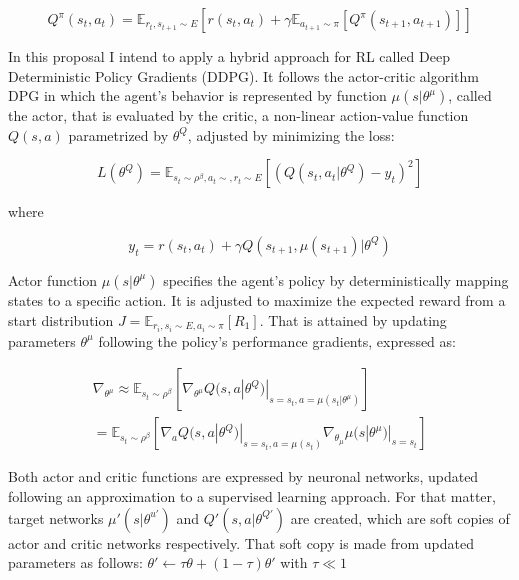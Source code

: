 \documentclass[peerreview]{IEEEtran}
\begin{document}
 \begin{equation}
 	Q^\pi(s_t, a_t) = \mathbb{E}_{r_t, s_{t+1} \sim E} [r(s_t, a_t) + \gamma\mathbb{E}_{a_{t+1} \sim \pi} [Q^\pi(s_{t+1}, a_{t+1})]]
 \end{equation}
 
 In this proposal I intend to apply a hybrid approach for RL called Deep Deterministic Policy Gradients (DDPG). It follows the actor-critic algorithm DPG in which the agent's behavior is represented by function $\mu(s|\theta^\mu)$, called the actor, that is evaluated by the critic, a non-linear action-value function $Q(s,a)$ parametrized by $\theta^Q$, adjusted by minimizing the loss:
 
 \begin{equation}
   L(\theta^Q) = \mathbb{E}_{s_t \sim \rho^\beta, a_t \sim, r_t \sim E}[(Q(s_t,a_t|\theta^Q)- y_t)^2]
 \end{equation}
 
 where
 
 \begin{equation}
 	y_t = r(s_t, a_t) + \gamma Q(s_{t+1}, \mu(s_{t+1})|\theta^Q)
 \end{equation}
 
Actor function $\mu(s|\theta^\mu)$ specifies the agent's policy by deterministically mapping states to a specific action. It is adjusted to maximize the expected reward from a start distribution $J=\mathbb{E}_{r_i, s_i \sim E, a_i \sim \pi}[R_1]$. That is attained by updating parameters $\theta^\mu$ following the policy's performance gradients, expressed as:

\begin{equation}
\begin{split}
	\nabla_{\theta^\mu} \approx \mathbb{E}_{s_t \sim \rho^\beta}[\nabla_{\theta^\mu}Q(s,a|\theta^Q)|_{s=s_t, a=\mu(s_t|\theta^\mu)}] \\	
	= \mathbb{E}_{s_t \sim \rho ^ \beta}[\nabla_a Q(s,a|\theta^Q)|_{s=s_t, a=\mu(s_t)} \nabla_{\theta_\mu} \mu(s|\theta^\mu)|_{s=s_t}]
	\end{split}
\end{equation}

 Both actor and critic functions are expressed by neuronal networks, updated following an approximation to a supervised learning approach. For that matter, target networks $\mu'(s|\theta^{u'})$ and $Q'(s,a|\theta^{Q'})$ are created, which are soft copies of actor and critic networks respectively. That soft copy is made from updated parameters as follows: $\theta'\leftarrow \tau \theta + (1-\tau)\theta'$ with $\tau \ll 1$
 
\end{document}

